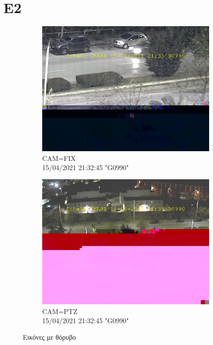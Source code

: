 \documentclass[hidelinks, 12pt, a4paper]{article}
\begin{document}
\section{E2}

\begin{figure}[h!]
     \begin{subfigure}[b]{0.5\textwidth}
         \centering
         \includegraphics[keepaspectratio, width=\textwidth]{image_with_errors_fix.jpg}
         \caption{CAM=FIX \\ 15/04/2021 21:32:45 "G0990"}
     \end{subfigure}
     \hfill
     \begin{subfigure}[b]{0.5\textwidth}
         \centering
         \includegraphics[keepaspectratio, width=\textwidth]{image_with_errors_ptz.jpg}
         \caption{CAM=PTZ \\ 15/04/2021 21:32:45 "G0990"}
     \end{subfigure}
     \caption{Εικόνες με θόρυβο}
\end{figure}
\end{document}
